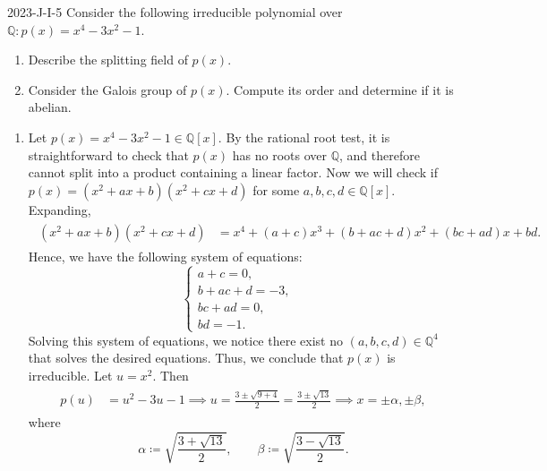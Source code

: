 \documentclass{article}
\begin{document}
	\begin{prb}{2023-J-I-5}
		Consider the following irreducible polynomial over $\mathbb{Q}: p(x) = x^{4} - 3x^{2} - 1$. \vspace{-0.25cm}
		\begin{enumerate}[itemsep =-2pt,label = (\alph{*})]
			\item Describe the splitting field of $p(x)$. 
			\item Consider the Galois group of $p(x)$. Compute its order and determine if it is abelian. 
		\end{enumerate}
	\end{prb}
	\begin{enumerate}[itemsep =-2pt,label = (\alph{*})]
		\item Let $p(x) = x^{4} - 3x^{2} - 1 \in \mathbb{Q}[x]$. By the rational root test, it is straightforward to check that $p(x)$ has no roots over $\mathbb{Q}$, and therefore cannot split into a product containing a linear factor. Now we will check if $p(x)= (x^{2} + ax + b)(x^{2} + cx + d)$ for some $a, b, c, d \in \mathbb{Q}[x]$. Expanding, 
		\begin{align*}
			\begin{split}
				(x^{2} + ax + b)(x^{2} + cx + d) &= x^{4} + (a + c)x^{3} + (b + ac + d)x^{2} + (bc + ad)x + bd. 
			\end{split}
		\end{align*}
		Hence, we have the following system of equations: 
		\begin{equation*}
			\begin{cases}
				a + c = 0, & \\
				b + ac + d = -3, & \\
				bc + ad = 0, & \\ 
				bd = -1. 
			\end{cases}
		\end{equation*}
		Solving this system of equations, we notice there exist no $(a, b, c, d) \in \mathbb{Q}^{4}$ that solves the desired equations. Thus, we conclude that $p(x)$ is irreducible. Let $u = x^{2}$. Then 
		\begin{align*}
			\begin{split}
				p(u) &= u^{2} - 3u - 1 \implies u = \frac{3 \pm \sqrt{9 + 4}}{2} = \frac{3 \pm \sqrt{13}}{2} \implies x = \pm \alpha, \pm \beta, 
			\end{split}
		\end{align*}
		where 
		\begin{equation*}
			\alpha \coloneqq \sqrt{\frac{3 + \sqrt{13}}{2}}, \qquad \beta \coloneqq \sqrt{\frac{3 - \sqrt{13}}{2}}. 

\end{equation*}
\end{enumerate}
\end{document}
